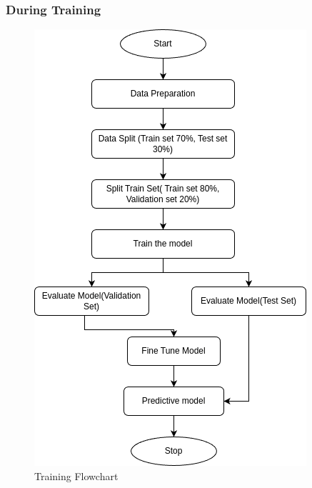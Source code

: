 \subsubsection{During Training}
\begin{figure}[H]
    \centering
    \includegraphics[scale=0.8]{images/training flowchart.png}
    \caption{Training Flowchart}
    \label{fig:flowtra}
\end{figure}

